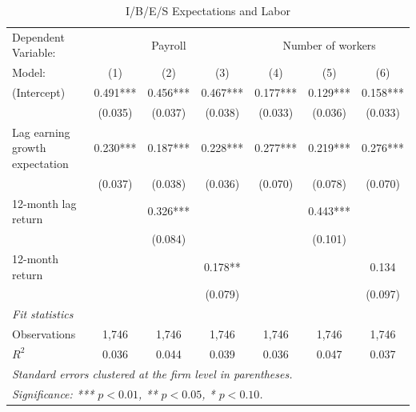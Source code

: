 \begin{table}[t]
\centering
\caption{I/B/E/S Expectations and Labor}
\label{tab:payroll}
\small
\begin{tabular}{lcccccc}
\toprule\toprule
Dependent Variable: & \multicolumn{3}{c}{Payroll} & \multicolumn{3}{c}{Number of workers} \\
Model: & (1) & (2) & (3) & (4) & (5) & (6) \\
\midrule
(Intercept) & 0.491*** & 0.456*** & 0.467*** & 0.177*** & 0.129*** & 0.158*** \\
 & (0.035) & (0.037) & (0.038) & (0.033) & (0.036) & (0.033) \\
Lag earning growth expectation & 0.230*** & 0.187*** & 0.228*** & 0.277*** & 0.219*** & 0.276*** \\
 & (0.037) & (0.038) & (0.036) & (0.070) & (0.078) & (0.070) \\
12-month lag return &  & 0.326*** &  &  & 0.443*** &  \\
 &  & (0.084) &  &  & (0.101) &  \\
12-month return &  &  & 0.178** &  &  & 0.134 \\
 &  &  & (0.079) &  &  & (0.097) \\
\midrule
\emph{Fit statistics} \\
Observations & 1,746 & 1,746 & 1,746 & 1,746 & 1,746 & 1,746 \\
$R^2$ & 0.036 & 0.044 & 0.039 & 0.036 & 0.047 & 0.037 \\
\midrule\midrule
\multicolumn{7}{l}{\emph{Standard errors clustered at the firm level in parentheses.}} \\
\multicolumn{7}{l}{\emph{Significance: *** $p<0.01$, ** $p<0.05$, * $p<0.10$.}} \\
\bottomrule
\end{tabular}
\end{table}
